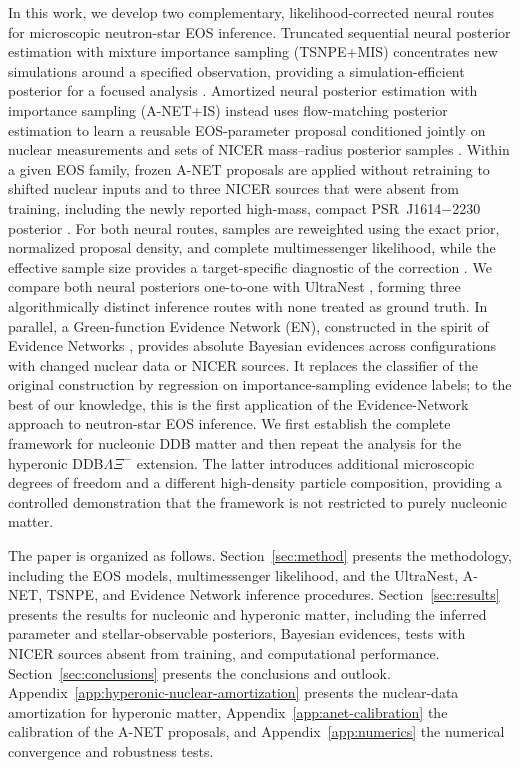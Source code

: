 \documentclass[aps,prd,twocolumn,superscriptaddress,nofootinbib,longbibliography]{revtex4-2}
\begin{document}
In this work, we develop two
complementary, likelihood-corrected neural routes for microscopic neutron-star
EOS inference. Truncated sequential neural posterior estimation with mixture
importance sampling (TSNPE+MIS) concentrates new simulations around a
specified observation, providing a simulation-efficient posterior for a
focused analysis \cite{Deistler:2022tsnpe}. Amortized neural posterior
estimation with importance sampling (A-NET+IS) instead uses flow-matching
posterior estimation to learn a reusable EOS-parameter proposal conditioned
jointly on nuclear measurements and sets of NICER
mass--radius posterior samples
\cite{Dax:2023ozk}. Within a given EOS family,
frozen A-NET proposals are applied without retraining to shifted nuclear
inputs and to three NICER sources that were absent from training, including
the newly reported high-mass, compact PSR~J1614$-$2230 posterior
\cite{Mauviard:2026gzc}. For both neural routes, samples are reweighted using
the exact prior, normalized proposal density, and complete multimessenger
likelihood, while the effective sample size provides a target-specific
diagnostic of the correction \cite{Dax:2022pxd}. We compare both neural posteriors
one-to-one with UltraNest \cite{Buchner:2021cql}, forming three algorithmically
distinct inference routes with none treated as ground truth.
In parallel, a Green-function Evidence Network (EN),
constructed in the spirit of Evidence Networks \cite{Jeffrey:2023stk},
provides absolute Bayesian evidences across configurations with changed
nuclear data or NICER sources. It replaces the classifier of the original
construction by regression on importance-sampling evidence labels; to the best of our
knowledge, this is the first application of the Evidence-Network approach to
neutron-star EOS inference.
We first establish the
complete framework for nucleonic DDB matter and then repeat the analysis for
the hyperonic DDB$\Lambda\Xi^-$ extension. The latter introduces additional
microscopic degrees of freedom and a different high-density particle
composition, providing a controlled demonstration that the framework is not
restricted to purely nucleonic matter.

The paper is organized as follows.
Section~\ref{sec:method} presents the methodology, including the EOS models,
multimessenger likelihood, and the UltraNest, A-NET, TSNPE, and Evidence
Network inference procedures. Section~\ref{sec:results} presents the results
for nucleonic and hyperonic matter, including the inferred parameter and
stellar-observable posteriors, Bayesian evidences, tests with NICER sources
absent from training, and computational performance.
Section~\ref{sec:conclusions} presents the conclusions and outlook.
Appendix~\ref{app:hyperonic-nuclear-amortization} presents the nuclear-data
amortization for hyperonic matter, Appendix~\ref{app:anet-calibration} the
calibration of the A-NET proposals, and Appendix~\ref{app:numerics} the
numerical convergence and robustness tests.
\end{document}
